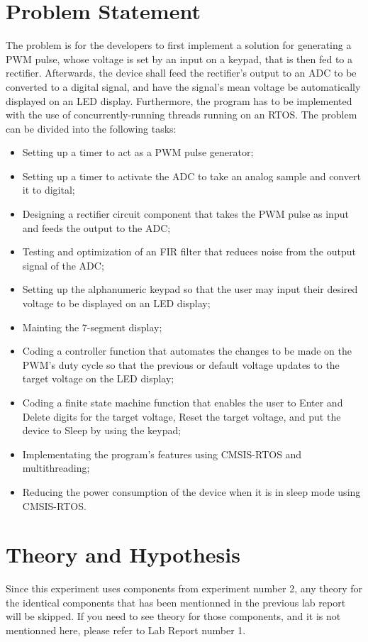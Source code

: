 \documentclass[12pt]{report}
\begin{document}
\section{Problem Statement}
The problem is for the developers to first implement a solution for generating a PWM pulse, whose voltage is set by an input on a keypad, that is then fed to a rectifier. Afterwards, the device shall feed the rectifier's output to an ADC to be converted to a digital signal, and have the signal's mean voltage be automatically displayed on an LED display. Furthermore, the program has to be implemented with the use of concurrently-running threads running on an RTOS. The problem can be divided into the following tasks:
\begin{itemize}
	\item Setting up a timer to act as a PWM pulse generator;
	\item Setting up a timer to activate the ADC to take an analog sample and convert it to digital;
	\item Designing a rectifier circuit component that takes the PWM pulse as input and feeds the output to the ADC;
	\item Testing and optimization of an FIR filter that reduces noise from the output signal of the ADC;
	\item Setting up the alphanumeric keypad so that the user may input their desired voltage to be displayed on an LED display;
	\item Mainting the 7-segment display;
	\item Coding a controller function that automates the changes to be made on the PWM's duty cycle so that the previous or default voltage updates to the target voltage on the LED display;
	\item Coding a finite state machine function that enables the user to Enter and Delete digits for the target voltage, Reset the target voltage, and put the device to Sleep by using the keypad;
	\item Implementating the program's features using CMSIS-RTOS and multithreading;
	\item Reducing the power consumption of the device when it is in sleep mode using CMSIS-RTOS.
\end{itemize}
\section{Theory and Hypothesis}
Since this experiment uses components from experiment number 2, any theory for the identical components that has been mentionned in the previous lab report will be skipped. If you need to see theory for those components, and it is not mentionned here, please refer to Lab Report number 1.
\end{document}
